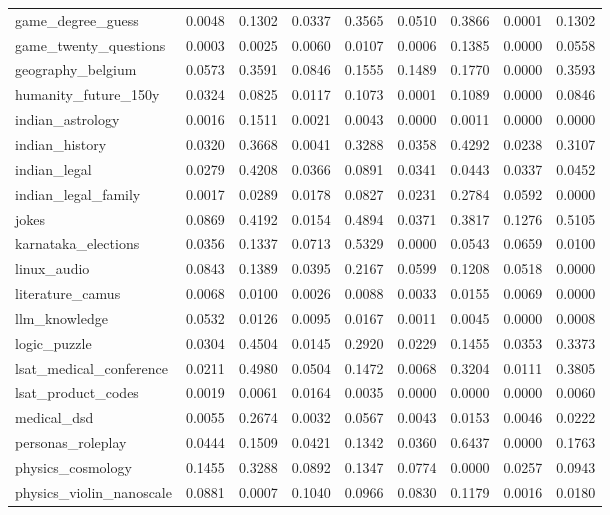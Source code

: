 \documentclass[pdflatex,sn-mathphys-num]{sn-jnl}%
\theoremstyle{thmstyleone}%
\theoremstyle{thmstyletwo}%
\theoremstyle{thmstylethree}%
\begin{document}
\begin{appendices}
\begin{landscape}
\begin{longtable}{@{}p{3.8cm}cccccccc@{}}
game\_degree\_guess & 0.0048 & 0.1302 & 0.0337 & 0.3565 & 0.0510 & 0.3866 & 0.0001 & 0.1302 \\
game\_twenty\_questions & 0.0003 & 0.0025 & 0.0060 & 0.0107 & 0.0006 & 0.1385 & 0.0000 & 0.0558 \\
geography\_belgium & 0.0573 & 0.3591 & 0.0846 & 0.1555 & 0.1489 & 0.1770 & 0.0000 & 0.3593 \\
humanity\_future\_150y & 0.0324 & 0.0825 & 0.0117 & 0.1073 & 0.0001 & 0.1089 & 0.0000 & 0.0846 \\
indian\_astrology & 0.0016 & 0.1511 & 0.0021 & 0.0043 & 0.0000 & 0.0011 & 0.0000 & 0.0000 \\
indian\_history & 0.0320 & 0.3668 & 0.0041 & 0.3288 & 0.0358 & 0.4292 & 0.0238 & 0.3107 \\
indian\_legal & 0.0279 & 0.4208 & 0.0366 & 0.0891 & 0.0341 & 0.0443 & 0.0337 & 0.0452 \\
indian\_legal\_family & 0.0017 & 0.0289 & 0.0178 & 0.0827 & 0.0231 & 0.2784 & 0.0592 & 0.0000 \\
jokes & 0.0869 & 0.4192 & 0.0154 & 0.4894 & 0.0371 & 0.3817 & 0.1276 & 0.5105 \\
karnataka\_elections & 0.0356 & 0.1337 & 0.0713 & 0.5329 & 0.0000 & 0.0543 & 0.0659 & 0.0100 \\
linux\_audio & 0.0843 & 0.1389 & 0.0395 & 0.2167 & 0.0599 & 0.1208 & 0.0518 & 0.0000 \\
literature\_camus & 0.0068 & 0.0100 & 0.0026 & 0.0088 & 0.0033 & 0.0155 & 0.0069 & 0.0000 \\
llm\_knowledge & 0.0532 & 0.0126 & 0.0095 & 0.0167 & 0.0011 & 0.0045 & 0.0000 & 0.0008 \\
logic\_puzzle & 0.0304 & 0.4504 & 0.0145 & 0.2920 & 0.0229 & 0.1455 & 0.0353 & 0.3373 \\
lsat\_medical\_conference & 0.0211 & 0.4980 & 0.0504 & 0.1472 & 0.0068 & 0.3204 & 0.0111 & 0.3805 \\
lsat\_product\_codes & 0.0019 & 0.0061 & 0.0164 & 0.0035 & 0.0000 & 0.0000 & 0.0000 & 0.0060 \\
medical\_dsd & 0.0055 & 0.2674 & 0.0032 & 0.0567 & 0.0043 & 0.0153 & 0.0046 & 0.0222 \\
personas\_roleplay & 0.0444 & 0.1509 & 0.0421 & 0.1342 & 0.0360 & 0.6437 & 0.0000 & 0.1763 \\
physics\_cosmology & 0.1455 & 0.3288 & 0.0892 & 0.1347 & 0.0774 & 0.0000 & 0.0257 & 0.0943 \\
physics\_violin\_nanoscale & 0.0881 & 0.0007 & 0.1040 & 0.0966 & 0.0830 & 0.1179 & 0.0016 & 0.0180 \\

\end{longtable}
\end{landscape}
\end{appendices}
\end{document}
